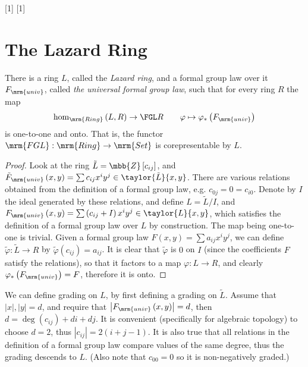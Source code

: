 \ncmd{\LR}[1]{}
\ncmd{\LRQ}[1]{}

\section{The Lazard Ring}

\begin{theorem*}
	There is a ring $L$, called the \emph{Lazard ring}, and a formal group law over it $F_\mrm{univ}$, called \emph{the universal formal group law},
	such that for every ring $R$ the map
	$$
		\hom_\mrm{Ring}\left(L,R\right)
		\to
		\FGL R
		\qquad
		\varphi \mapsto \varphi_*\left(F_\mrm{univ}\right)
	$$
	is one-to-one and onto.
	That is, the functor $\mrm{FGL}: \mrm{Ring} \to \mrm{Set}$ is corepresentable by $L$.
\end{theorem*}

\begin{proof}
	Look at the ring $\tilde{L} = \mbb{Z}\left[c_{ij}\right]$,
	and
	$
		\tilde{F}_\mrm{univ}\left(x,y\right)
		=
		\sum c_{ij} x^i y^j
		\in
		\taylor{\tilde{L}}{x,y}
	$.
	There are various relations obtained from the definition of a formal group law, e.g. $c_{0j} = 0 = c_{i0}$.
	Denote by $I$ the ideal generated by these relations, and define $L=\tilde{L}/I$,
	and
	$
		F_\mrm{univ}\left(x,y\right)
		=
		\sum \left(c_{ij} + I\right) x^i y^j
		\in
		\taylor{L}{x,y}
	$,
	which satisfies the definition of a formal group law over $L$ by construction.
	The map being one-to-one is trivial.
	Given a formal group law $F\left(x,y\right) = \sum a_{ij} x^i y^j$,
	we can define $\tilde{\varphi}: \tilde{L} \to R$ by $\tilde{\varphi}\left(c_{ij}\right) = a_{ij}$.
	It is clear that $\tilde{\varphi}$ is $0$ on $I$ (since the coefficients $F$ satisfy the relations), so that it factors to a map $\varphi: L \to R$, and clearly $\varphi_*\left(F_\mrm{univ}\right) = F$,
	therefore it is onto.
\end{proof}

We can define grading on $L$, by first defining a grading on $\tilde{L}$.
Assume that $\left|x\right|,\left|y\right| = d$, and require that $\left|F_\mrm{univ}\left(x,y\right)\right| = d$, then $d = \deg\left(c_{ij}\right) + di +dj$.
It is convenient (specifically for algebraic topology) to choose $d=2$, thus $\left|c_{ij}\right| = 2\left(i+j-1\right)$.
It is also true that all relations in the definition of a formal group law compare values of the same degree, thus the grading descends to $L$.
(Also note that $c_{00}=0$ so it is non-negatively graded.)


